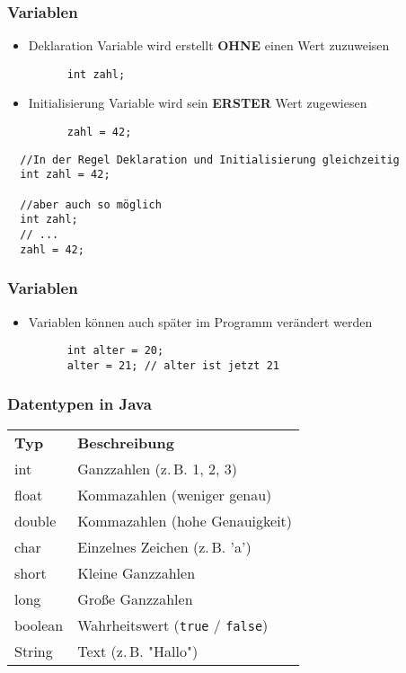 \documentclass{../../presentation}
\begin{document}
\begin{frame}[fragile]
  \frametitle{Variablen}
  \pause
  \begin{itemize}
    \item Deklaration \quad \textrightarrow \quad Variable wird erstellt \textbf{OHNE} einen Wert zuzuweisen
          \begin{verbatim}
      int zahl;
    \end{verbatim}
          \pause
    \item Initialisierung \quad \textrightarrow \quad Variable wird sein \textbf{ERSTER} Wert zugewiesen
          \begin{verbatim}
      zahl = 42;
    \end{verbatim}
          \pause
  \end{itemize}
  \begin{verbatim}
  //In der Regel Deklaration und Initialisierung gleichzeitig
  int zahl = 42;

  //aber auch so möglich
  int zahl;
  // ...
  zahl = 42;
  \end{verbatim}
\end{frame}

\begin{frame}[fragile]
  \frametitle{Variablen}
  \pause
  \begin{itemize}
    \item Variablen können auch später im Programm verändert werden
          \begin{verbatim}
      int alter = 20;
      alter = 21; // alter ist jetzt 21
    \end{verbatim}
  \end{itemize}
\end{frame}

\begin{frame}
  \frametitle{Datentypen in Java}
  \pause
  \centering
  \begin{tabular}{l l}
    \rowcolor{tablehead}
    \textbf{Typ} & \textbf{Beschreibung}                          \\
    int          & Ganzzahlen (z.\,B. 1, 2, 3)                    \\
    float        & Kommazahlen (weniger genau)                    \\
    double       & Kommazahlen (hohe Genauigkeit)                 \\
    char         & Einzelnes Zeichen (z.\,B. 'a')                 \\
    short        & Kleine Ganzzahlen                              \\
    long         & Große Ganzzahlen                               \\
    boolean      & Wahrheitswert (\texttt{true} / \texttt{false}) \\
    String       & Text (z.\,B. "Hallo")                          \\
  \end{tabular}
\end{frame}
\end{document}
